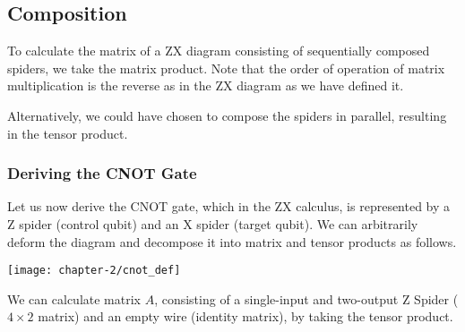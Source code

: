 
\subsection{Composition}
To calculate the matrix of a ZX diagram consisting of sequentially composed spiders, we take the matrix product. Note that the order of operation of matrix multiplication is the reverse as in the ZX diagram as we have defined it.


Alternatively, we could have chosen to compose the spiders in parallel, resulting in the tensor product.


\subsubsection{Deriving the CNOT Gate}
Let us now derive the CNOT gate, which in the ZX calculus, is represented by a Z spider (control qubit) and an X spider (target qubit). We can arbitrarily deform the diagram and decompose it into matrix and tensor products as follows.

\begin{center}
    \texttt{[image: chapter-2/cnot\_def]}
\end{center}

We can calculate matrix $A$, consisting of a single-input and two-output Z Spider ($4 \times 2$ matrix) and an empty wire (identity matrix), by taking the tensor product.

